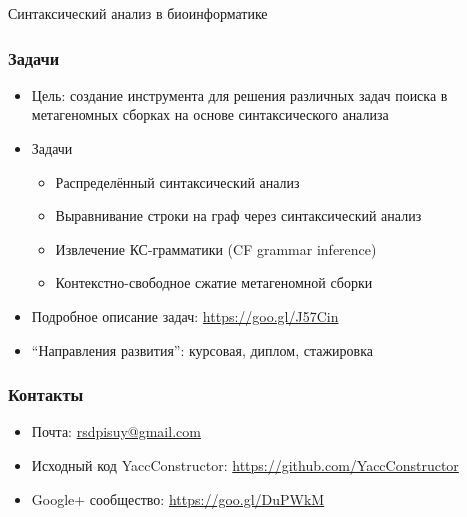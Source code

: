\documentclass{beamer}
\begin{document}
\begin{frame}[plain,c]
 \transwipe[direction=90]
 \begin{center}
  \Huge Синтаксический анализ в биоинформатике
 \end{center}
\end{frame}

\begin{frame}[fragile]
\transwipe[direction=90]
\frametitle{Задачи}
\begin{itemize}
\item Цель: создание инструмента для решения различных задач поиска в метагеномных сборках на 
основе синтаксического анализа
\item Задачи
\begin{itemize}
\item Распределённый синтаксический анализ
\item Выравнивание строки на граф через синтаксический анализ
\item Извлечение КС-грамматики (CF grammar inference)
\item Контекстно-свободное сжатие метагеномной сборки
\end{itemize}
\item Подробное описание задач: \url{https://goo.gl/J57Cin}
\item ``Направления развития'': курсовая, диплом, стажировка
\end{itemize}
\end{frame}
            
\begin{frame}
\transwipe[direction=90]
\frametitle{Контакты}
\begin{itemize}
  \item Почта: \url{rsdpisuy@gmail.com}
  \item Исходный код YaccConstructor: \url{https://github.com/YaccConstructor}
  \item Google+ сообщество: \url{https://goo.gl/DuPWkM}
\end{itemize}
\end{frame}
\end{document}
